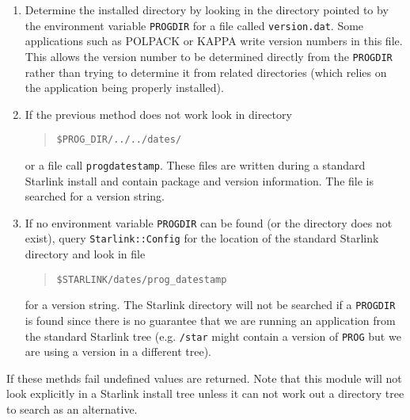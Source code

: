 \documentclass[twoside,11pt]{article}
\newenvironment{myquote}{\begin{quote}\begin{small}}{\end{small}\end{quote}}
\renewcommand{\_}{\texttt{\symbol{95}}}
\begin{document}
\begin{enumerate}
\item 

Determine the installed directory by looking in the directory pointed
to by the environment variable \texttt{PROG\_DIR} for a file called 
\texttt{version.dat}. Some applications such as POLPACK or KAPPA write 
version numbers in this file. This allows the version number to be determined
directly from the \texttt{PROG\_DIR} rather than trying to determine it from
related directories (which relies on the application being properly
installed).

\item 

If the previous method does not work look in directory

\begin{myquote}
\begin{verbatim}
$PROG_DIR/../../dates/
\end{verbatim}
\end{myquote} %

or a file call \texttt{prog\_datestamp}. These files are written during a
standard Starlink install and contain package and version information.  The
file is searched for a version string.

\item 
  
  If no environment variable \texttt{PROG\_DIR} can be found (or the directory
  does not exist), query \texttt{Starlink::Config} for the location of the
  standard Starlink directory and look in file

\begin{myquote}
\begin{verbatim}
$STARLINK/dates/prog_datestamp
\end{verbatim}
\end{myquote} %

for a version string. The Starlink directory will not be searched if a
\texttt{PROG\_DIR} is found since there is no guarantee that we are running an
application from the standard Starlink tree (e.g. \texttt{/star} might contain
a version of \texttt{PROG} but we are using a version in a different tree).

\end{enumerate}


If these methds fail undefined values are returned. Note that
this module will not look explicitly in a Starlink install tree
unless it can not work out a directory tree to search as an alternative.
\end{document}
